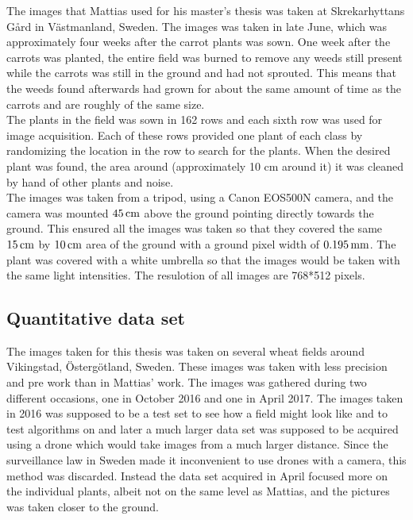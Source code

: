 The images that Mattias used for his master's thesis was taken at Skrekarhyttans Gård in Västmanland, Sweden. The images was taken in late June, which was approximately four weeks after the carrot plants was sown. One week after the carrots was planted, the entire field was burned to remove any weeds still present while the carrots was still in the ground and had not sprouted. This means that the weeds found afterwards had grown for about the same amount of time as the carrots and are roughly of the same size. \\

The plants in the field was sown in 162 rows and each sixth row was used for image acquisition. Each of these rows provided one plant of each class by randomizing the location in the row to search for the plants. When the desired plant was found, the area around (approximately 10 cm around it) it was cleaned by hand of other plants and noise. \\

The images was taken from a tripod, using a Canon EOS500N camera, and the camera was mounted $\unit[45]{cm}$ above the ground pointing directly towards the ground. This ensured all the images was taken so that they covered the same $\unit[15]{cm}$ by $\unit[10]{cm}$ area of the ground with a ground pixel width of $\unit[0.195]{mm}$. The plant was covered with a white umbrella so that the images would be taken with the same light intensities. The resulotion of all images are 768*512 pixels.\cite{WeedClassification}

\subsection{Quantitative data set}

The images taken for this thesis was taken on several wheat fields around Vikingstad, Östergötland, Sweden. These images was taken with less precision and pre work than in Mattias' work. The images was gathered during two different occasions, one in October 2016 and one in April 2017. The images taken in 2016 was supposed to be a test set to see how a field might look like and to test algorithms on and later a much larger data set was supposed to be acquired using a drone which would take images from a much larger distance. Since the surveillance law in Sweden made it inconvenient to use drones with a camera, this method was discarded. Instead the data set acquired in April focused more on the individual plants, albeit not on the same level as Mattias, and the pictures was taken closer to the ground. \\

